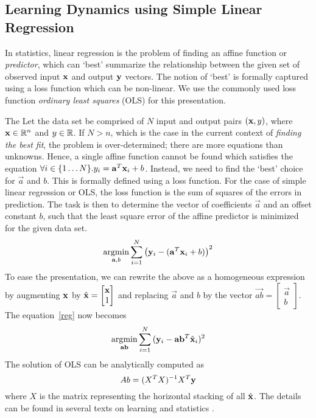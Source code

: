 \subsection{Learning Dynamics using Simple Linear Regression}

In statistics, linear regression is the problem of finding an affine
function or \textit{predictor}, which can `best' summarize the
relationship between the given set of observed input $\mathbf{x}$ and output
$\mathbf{y}$ vectors. The notion of `best' is formally captured using a loss
function which can be non-linear. We use the commonly used loss
function \textit{ordinary least squares} (OLS) for this presentation.


The
Let the data set be comprised of $N$ input and output pairs $(\mathbf{x}, y)$,
where $\mathbf{x}\in\mathbb{R}^n$ and $y\in\mathbb{R}$. If $N>n$, which is the case in
the current context of \textit{finding the best fit}, the problem is
over-determined; there are more equations than unknowns. Hence, a
single affine function cannot be found which satisfies the equation
$\forall i\in\{1\ldots N\}. y_i = \mathbf{a}^T\mathbf{x}_i + b$. Instead, we need
to find the `best' choice for $\vec{a}$ and $b$. This is formally
defined using a loss function. For the case of simple linear
regression or OLS, the loss function is the sum of squares of the
errors in prediction.  The task is then to determine the vector of
coefficients $\vec{a}$ and an offset constant $b$, such that the least
square error of the affine predictor is minimized for the given data
set.
\begin{equation}
    \operatornamewithlimits{argmin}_{\vec{a}, b}\displaystyle\sum_{i=1}^{N}{\left(\y_i - (\vec{a}^T\x_i + b)\right)^2}
\label{reg}
\end{equation}
To ease the presentation, we can rewrite the above as a homogeneous
expression by augmenting $\mathbf{x}$ by $\hat{\mathbf{x}} = \begin{bmatrix}\mathbf{x} \\ 1\end{bmatrix}$ and replacing $\vec{a}$ and $b$ by the vector
$\vec{ab} = \begin{bmatrix}\vec{a} \\ b \end{bmatrix}$. The equation~\ref{reg} now becomes
\[
    \operatornamewithlimits{argmin}_{\vec{ab}}\displaystyle\sum_{i=1}^{N}{(\y_i - \vec{ab}^T \hat{\x}_i)^2}
\]
The solution of OLS can be analytically computed as
\[ Ab = (X^TX)^{-1}X^T\mathbf{y}\]
where $X$ is the matrix representing the horizontal stacking of all
$\hat{\mathbf{x}}$.
The details can be found in several texts on learning and statistics
\cite{friedman2001elements}.

